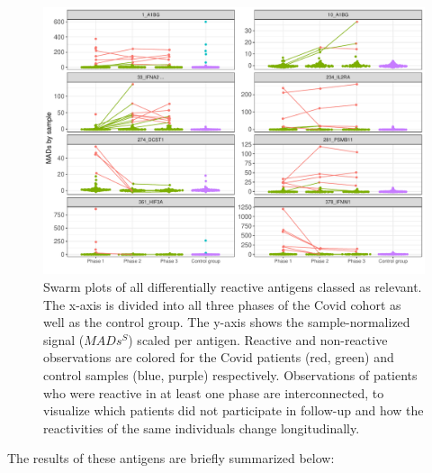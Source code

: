 \documentclass{article}
\begin{document}
\begin{figure}[H]
	\centering
    \includegraphics[width=\linewidth]{figures/gucci_relevant.pdf}
	\caption{Swarm plots of all differentially reactive antigens classed as relevant. The x-axis is divided into all three phases of the Covid cohort as well as the control group. The y-axis shows the sample-normalized signal ($MADs^S$) scaled per antigen. Reactive and non-reactive observations are colored for the Covid patients (red, green) and control samples (blue, purple) respectively. Observations of patients who were reactive in at least one phase are interconnected, to visualize which patients did not participate in follow-up and how the reactivities of the same individuals change longitudinally.}
	\label{gucci_relevant}
\end{figure}

The results of these antigens are briefly summarized below:
\end{document}
